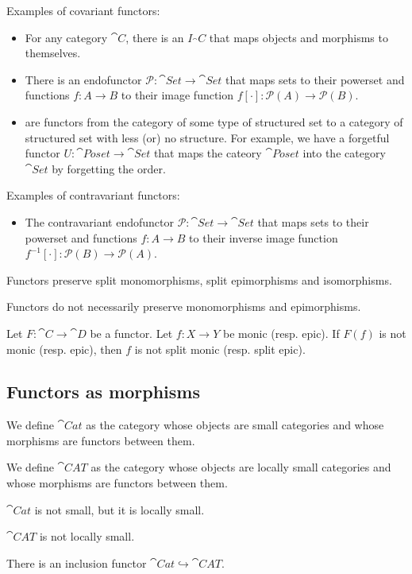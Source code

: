 \begin{example}
Examples of covariant functors:
\begin{itemize}
\item For any category $\cat{C}$, there is an  $I_\cat{C}$ that maps objects and morphisms to themselves.
\item There is an endofunctor $\mathcal{P}:\cat{Set} \to \cat{Set}$ that maps sets to their powerset and functions $f:A\to B$ to their image function $f[\cdot]:\mathcal{P}(A)\to \mathcal{P}(B)$.
\item {} are functors from the category of some type of structured set to a category of structured set with less (or) no structure. For example, we have a forgetful functor $U: \cat{Poset} \to \cat{Set}$ that maps the cateory $\cat{Poset}$ into the category $\cat{Set}$ by forgetting the order. 
\end{itemize}
Examples of contravariant functors:
\begin{itemize}
\item The contravariant endofunctor $\mathcal{P}:\cat{Set} \to \cat{Set}$ that maps sets to their powerset and functions $f:A\to B$ to their inverse image function $f^{-1}[\cdot]:\mathcal{P}(B)\to \mathcal{P}(A)$.
\end{itemize}
\end{example}

\begin{lemma} \label{functorMorphismPreservation}
Functors preserve split monomorphisms, split epimorphisms and isomorphisms.
\end{lemma}
Functors do not necessarily preserve monomorphisms and epimorphisms.
\begin{corollary}
Let $F:\cat{C}\to \cat{D}$ be a functor. Let $f:X \to Y$ be monic (resp. epic). If $F(f)$ is not monic (resp. epic), then $f$ is not split monic (resp. split epic).
\end{corollary}

\subsection{Functors as morphisms}
\begin{definition}
We define $\cat{Cat}$ as the category whose objects are small categories and whose morphisms are functors between them.

We define $\cat{CAT}$ as the category whose objects are locally small categories and whose morphisms are functors between them.
\end{definition}
\begin{lemma}
$\cat{Cat}$ is not small, but it is locally small.

$\cat{CAT}$ is not locally small.
\end{lemma}
There is an inclusion functor $\cat{Cat} \hookrightarrow \cat{CAT}$.

